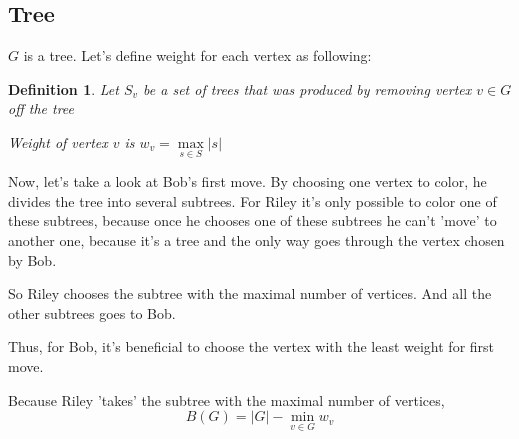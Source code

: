 \documentclass[12pt,a4paper, flushleft]{article}
\newtheorem{Def}{Definition}[section]
\begin{document}
\subsection{Tree} $G$ is a tree. Let's define weight for each vertex as following:
	
	\begin{Def}
		Let $S_v$ be a set of trees that was produced by removing vertex $v\in G$ off the tree
		
		Weight of vertex $v$ is $w_v = \max\limits_{s\in S}|s|$
	\end{Def}
	
	Now, let's take a look at Bob's first move. By choosing one vertex to color, he divides the tree into several subtrees. For Riley it's only possible to color one of these subtrees, because once he chooses one of these subtrees he can't 'move' to another one, because it's a tree and the only way goes through the vertex chosen by Bob. 
	
	So Riley chooses the subtree with the maximal number of vertices. And all the other subtrees goes to Bob.
	
	Thus, for Bob, it's beneficial to choose the vertex with the least weight for first move. 
	
	Because Riley 'takes' the subtree with the maximal number of vertices, $$B(G) = |G| - \min\limits_{v\in G} w_v$$
	
\end{document}
